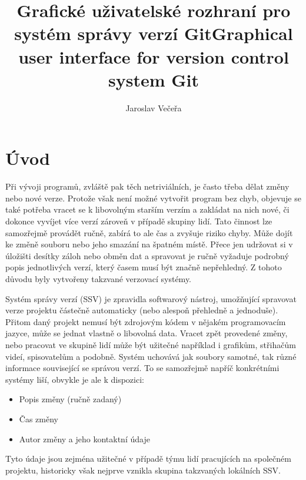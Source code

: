 \documentclass[
  biblatex,
  glossaries,
  index
]{kidiplom}
\title{Grafické uživatelské rozhraní pro systém správy verzí Git}
\title[english]{Graphical user interface for version control system Git}
\author{Jaroslav Večeřa}
\begin{document}
\maketitle



\newcommand{\BibLaTeX}{\textsc{Bib}\LaTeX}

\section{Úvod}
Při vývoji programů, zvláště pak těch netriviálních, je často třeba
dělat změny nebo nové verze. Protože však není možné vytvořit program
bez chyb, objevuje se také potřeba vracet se k libovolným starším
verzím a zakládat na nich nové, či dokonce vyvíjet více verzí zároveň v
případě skupiny lidí. Tato činnost lze samozřejmě provádět ručně,
zabírá to ale čas a zvyšuje riziko chyby. Může dojít ke změně souboru
nebo jeho smazání na špatném místě. Přece jen udržovat si v úložišti
desítky záloh nebo obměn dat a spravovat je ručně vyžaduje podrobný
popis jednotlivých verzí, který časem musí být značně nepřehledný.
Z tohoto důvodu byly vytvořeny takzvané verzovací systémy.

Systém správy verzí (SSV) je zpravidla softwarový nástroj,
umožňující spravovat verze projektu částečně automaticky (nebo alespoň
přehledně a jednoduše). Přitom daný projekt nemusí být zdrojovým kódem
v nějakém programovacím jazyce, může se jednat vlastně o libovolná data.
Vracet zpět provedené změny, nebo pracovat ve skupině lidí může být
užitečné například i grafikům, střihačům videí, spisovatelům a podobně.
Systém uchovává jak soubory samotné, tak různé informace související
se správou verzí. To se samozřejmě napříč konkrétními systémy liší,
obvykle je ale k dispozici:
\begin{itemize}
\item Popis změny (ručně zadaný)
\item Čas změny
\item Autor změny a jeho kontaktní údaje
\end{itemize}

Tyto údaje jsou zejména užitečné v případě týmu lidí pracujících na
společném projektu, historicky však nejprve vznikla skupina takzvaných
lokálních SSV.
\end{document}
